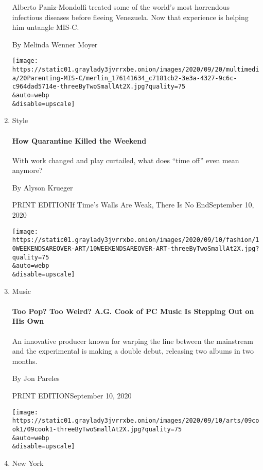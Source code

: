 \begin{enumerate}
  Alberto Paniz-Mondolfi treated some of the world's most horrendous
  infectious diseases before fleeing Venezuela. Now that experience is
  helping him untangle MIS-C.

  By Melinda Wenner Moyer

  \texttt{[image: https://static01.graylady3jvrrxbe.onion/images/2020/09/20/multimedia/20Parenting-MIS-C/merlin\_176141634\_c7181cb2-3e3a-4327-9c6c-c964dad5714e-threeByTwoSmallAt2X.jpg?quality=75\\\&auto=webp\\\&disable=upscale]}
\item
  Style

  \href{/2020/09/09/style/what-should-i-do-this-weekend.html?searchResultPosition=6}{}

  \hypertarget{how-quarantine-killed-the-weekend}{%
  \paragraph{How Quarantine Killed the
  Weekend}\label{how-quarantine-killed-the-weekend}}

  With work changed and play curtailed, what does ``time off'' even mean
  anymore?

  By Alyson Krueger

  PRINT EDITIONIf Time's Walls Are Weak, There Is No
  End\textbar{}September 10, 2020

  \texttt{[image: https://static01.graylady3jvrrxbe.onion/images/2020/09/10/fashion/10WEEKENDSAREOVER-ART/10WEEKENDSAREOVER-ART-threeByTwoSmallAt2X.jpg?quality=75\\\&auto=webp\\\&disable=upscale]}
\item
  Music

  \href{/2020/09/09/arts/music/ag-cook-pc-music-apple.html?searchResultPosition=7}{}

  \hypertarget{too-pop-too-weird-ag-cook-of-pc-music-is-stepping-out-on-his-own}{%
  \paragraph{Too Pop? Too Weird? A.G. Cook of PC Music Is Stepping Out
  on His
  Own}\label{too-pop-too-weird-ag-cook-of-pc-music-is-stepping-out-on-his-own}}

  An innovative producer known for warping the line between the
  mainstream and the experimental is making a double debut, releasing
  two albums in two months.

  By Jon Pareles

  PRINT EDITIONSeptember 10, 2020

  \texttt{[image: https://static01.graylady3jvrrxbe.onion/images/2020/09/10/arts/09cook1/09cook1-threeByTwoSmallAt2X.jpg?quality=75\\\&auto=webp\\\&disable=upscale]}
\item
  New York


\end{enumerate}
